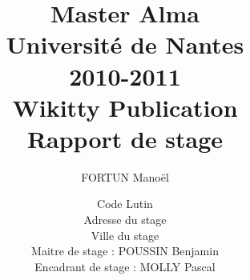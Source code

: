 \documentclass[12pt,a4paper,utf8x]{article}
\title
{
	\normalsize{Master Alma\\
	Université de Nantes\\
	2010-2011}\\
	\vspace{15mm}
	\Huge{Wikitty Publication}\\
	\normalsize{Rapport de stage}
}
\author{FORTUN Manoël\\
	\vspace{45mm}
}
\date{	
	\normalsize{Code Lutin\\
	Adresse du stage\\
	Ville du stage\\ 
	\vspace{5mm}	
	Maitre de stage : POUSSIN Benjamin \\
	Encadrant de stage : MOLLY Pascal
	}
}
\begin{document}
\maketitle

\clearpage

\newpage
\null

\newpage





\clearpage



\clearpage

\clearpage




\clearpage



\tableofcontents




\clearpage


\clearpage


\clearpage

\clearpage



\clearpage


\clearpage


\end{document}

